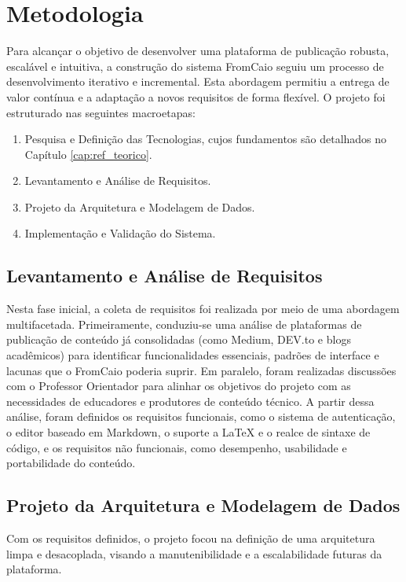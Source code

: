 \chapter{Metodologia}\label{cap:metodologia}

Para alcançar o objetivo de desenvolver uma plataforma de publicação robusta, escalável e intuitiva, a construção do sistema FromCaio seguiu um processo de desenvolvimento iterativo e incremental. Esta abordagem permitiu a entrega de valor contínua e a adaptação a novos requisitos de forma flexível. O projeto foi estruturado nas seguintes macroetapas:

\begin{enumerate}
    \item Pesquisa e Definição das Tecnologias, cujos fundamentos são detalhados no Capítulo \ref{cap:ref_teorico}.
    \item Levantamento e Análise de Requisitos.
    \item Projeto da Arquitetura e Modelagem de Dados.
    \item Implementação e Validação do Sistema.
\end{enumerate}


\section{Levantamento e Análise de Requisitos}\label{section:req}

Nesta fase inicial, a coleta de requisitos foi realizada por meio de uma abordagem multifacetada. Primeiramente, conduziu-se uma análise de plataformas de publicação de conteúdo já consolidadas (como Medium, DEV.to e blogs acadêmicos) para identificar funcionalidades essenciais, padrões de interface e lacunas que o FromCaio poderia suprir. Em paralelo, foram realizadas discussões com o Professor Orientador para alinhar os objetivos do projeto com as necessidades de educadores e produtores de conteúdo técnico. A partir dessa análise, foram definidos os requisitos funcionais, como o sistema de autenticação, o editor baseado em Markdown, o suporte a LaTeX e o realce de sintaxe de código, e os requisitos não funcionais, como desempenho, usabilidade e portabilidade do conteúdo.


\section{Projeto da Arquitetura e Modelagem de Dados}

Com os requisitos definidos, o projeto focou na definição de uma arquitetura limpa e desacoplada, visando a manutenibilidade e a escalabilidade futuras da plataforma.

